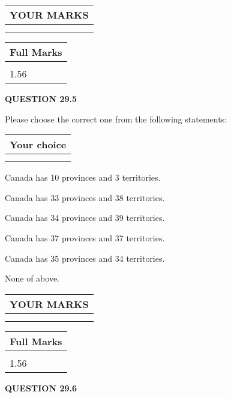 \documentclass[12pt]{article}
\begin{document}
  
\vspace{0.2in}
  
\noindent\begin{tabular}{|l|}
\hline
 YOUR MARKS  \\
\hline
 \\ 
 \\ 
\hline
\end{tabular}
\hspace{0.05in} \begin{tabular}{|l|}
\hline
 Full Marks  \\
\hline
 \\ 
1.56 \\
\hline
\end{tabular}
{\textbf{\Large{QUESTION
29.5 
}}}
  
  
Please choose the correct one from the following statements:
  
  
\noindent\hspace{3.0in} \begin{tabular}{|l|}
\hline
Your choice \\
\hline
 \\ 
 \\ 
\hline
\end{tabular}
  
  
 
 
Canada has  %
10 provinces and  %
3 territories.
 
 
Canada has  %
33 provinces and  %
38 territories.
 
 
Canada has  %
34 provinces and  %
39 territories.
 
 
Canada has  %
37 provinces and  %
37 territories.
 
 
Canada has  %
35 provinces and  %
34 territories.
 
 
 None of above.
 
 
  
\vspace{0.2in}
  
\noindent\begin{tabular}{|l|}
\hline
 YOUR MARKS  \\
\hline
 \\ 
 \\ 
\hline
\end{tabular}
\hspace{0.05in} \begin{tabular}{|l|}
\hline
 Full Marks  \\
\hline
 \\ 
1.56 \\
\hline
\end{tabular}
{\textbf{\Large{QUESTION
29.6 
}}}
  
\end{document}

